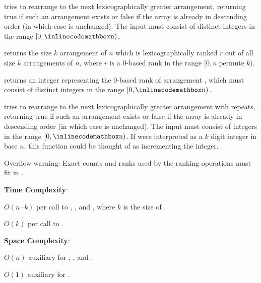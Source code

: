 \begin{compactitem}
  \item {} tries to rearrange  to the next lexicographically greater arrangement, returning true if such an arrangement exists or false if the array is already in descending order (in which case  is unchanged). The input  must consist of distinct integers in the range $[0, {\inlinecodemath{n}})$.
  \item {} returns the size $k$ arrangement of $n$ which is lexicographically ranked $r$ out of all size $k$ arrangements of $n$, where $r$ is a 0-based rank in the range $[0, n \mathbin{\text{permute}} k)$.
  \item {} returns an integer representing the 0-based rank of arrangement , which must consist of distinct integers in the range $[0, {\inlinecodemath{n}})$.
  \item {} tries to rearrange  to the next lexicographically greater arrangement with repeats, returning true if such an arrangement exists or false if the array is already in descending order (in which case  is unchanged). The input  must consist of integers in the range $[0, {\inlinecodemath{n}})$. If  were interpreted as a $k$ digit integer in base $n$, this function could be thought of as incrementing the integer.
\end{compactitem}

Overflow warning: Exact counts and ranks used by the ranking operations must fit in .

\textbf{Time Complexity}:
\begin{compactitem}
  \item $O(n \cdot k)$ per call to , , and , where $k$ is the size of .
  \item $O(k)$ per call to .
\end{compactitem}

\textbf{Space Complexity}:
\begin{compactitem}
  \item $O(n)$ auxiliary for , , and .
  \item $O(1)$ auxiliary for .
\end{compactitem}

